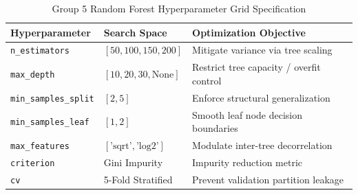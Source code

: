 \begin{table}[htbp]
\centering
\caption{Group 5 Random Forest Hyperparameter Grid Specification}
\label{tab:rf_hyperparams}
\begin{tabular}{|l|l|p{3.2cm}|}
\hline
\textbf{Hyperparameter} & \textbf{Search Space} & \textbf{Optimization Objective} \\
\hline
\texttt{n\_estimators} & $[50, 100, 150, 200]$ & Mitigate variance via tree scaling \\
\hline
\texttt{max\_depth} & $[10, 20, 30, \text{None}]$ & Restrict tree capacity / overfit control \\
\hline
\texttt{min\_samples\_split} & $[2, 5]$ & Enforce structural generalization \\
\hline
\texttt{min\_samples\_leaf} & $[1, 2]$ & Smooth leaf node decision boundaries \\
\hline
\texttt{max\_features} & $[\text{'sqrt'}, \text{'log2'}]$ & Modulate inter-tree decorrelation \\
\hline
\texttt{criterion} & Gini Impurity & Impurity reduction metric \\
\hline
\texttt{cv} & 5-Fold Stratified & Prevent validation partition leakage \\
\hline
\end{tabular}
\end{table}
